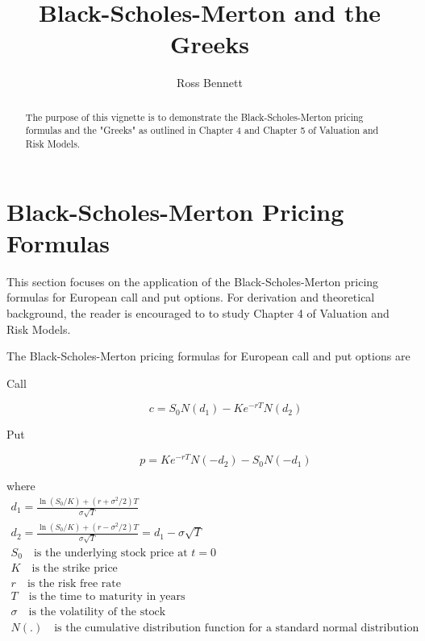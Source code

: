 \documentclass{article}\usepackage[]{graphicx}\usepackage[]{color}
\begin{document}
\title{Black-Scholes-Merton and the Greeks}
\author{Ross Bennett}

\maketitle

\begin{abstract}
The purpose of this vignette is to demonstrate the Black-Scholes-Merton pricing formulas and the "Greeks" as outlined in Chapter 4 and Chapter 5 of Valuation and Risk Models.
\end{abstract}

\tableofcontents

\section{Black-Scholes-Merton Pricing Formulas}
This section focuses on the application of the Black-Scholes-Merton pricing formulas for European call and put options. For derivation and theoretical background, the reader is encouraged to to study Chapter 4 of Valuation and Risk Models.

The Black-Scholes-Merton pricing formulas for European call and put options are
\begin{description}
  \item[Call]
  \begin{equation*}
  c = S_0 N(d_1) - K e^{-rT} N(d_2)
  \end{equation*}
  \item[Put]
  \begin{equation*}
  p = K e^{-rT} N(-d_2) - S_0 N(-d_1)
  \end{equation*}
\end{description}

where
\begin{eqnarray*}
  d_1 = \frac{\ln (S_0 / K) + (r + \sigma^2 / 2) T}{\sigma \sqrt{T}}\\
  d_2 = \frac{\ln (S_0 / K) + (r - \sigma^2 / 2) T}{\sigma \sqrt{T}} = d_1 - \sigma \sqrt{T}\\
  S_0 \quad \text{is the underlying stock price at $t = 0$}\\
  K \quad \text{is the strike price}\\
  r \quad \text{is the risk free rate}\\
  T \quad \text{is the time to maturity in years}\\
  \sigma \quad \text{is the volatility of the stock}\\
  N(.) \quad \text{is the cumulative distribution function for a standard normal distribution}
\end{eqnarray*}
\end{document}
